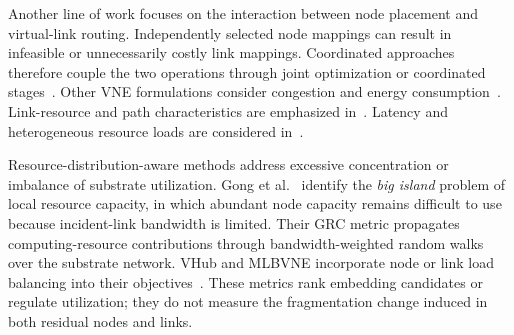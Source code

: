 \documentclass{ieeeaccess}
\begin{document}
Another line of work focuses on the interaction between node placement and virtual-link routing.
Independently selected node mappings can result in infeasible or unnecessarily costly link mappings.
Coordinated approaches therefore couple the two operations through joint optimization or
coordinated stages~\cite{chowdhury2012vineyard,lu2023performance,nguyen2022toward}. Other VNE
formulations consider congestion and energy consumption~\cite{pham2019congestion}. Link-resource
and path characteristics are emphasized in~\cite{zheng2017link}. Latency and heterogeneous
resource loads are considered in~\cite{yan2019latency}.

Resource-distribution-aware methods address excessive concentration or imbalance of substrate
utilization. Gong et al.~\cite{gong2014toward} identify the \emph{big island} problem of local
resource capacity, in which abundant node capacity remains difficult to use because incident-link
bandwidth is limited. Their GRC metric propagates computing-resource contributions through
bandwidth-weighted random walks over the substrate network. VHub and MLBVNE incorporate node or
link load balancing into their objectives~\cite{shanbhag2015vhub,li2022load}. These metrics rank
embedding candidates or regulate utilization; they do not measure the fragmentation change induced
in both residual nodes and links.


\end{document}
